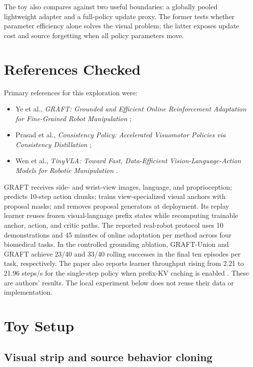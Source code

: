 \documentclass[11pt]{article}
\begin{document}
The toy also compares against two useful boundaries: a globally pooled lightweight adapter and a full-policy update proxy. The former tests whether parameter efficiency alone solves the visual problem; the latter exposes update cost and source forgetting when all policy parameters move.

\section{References Checked}

Primary references for this exploration were:
\begin{itemize}[leftmargin=1.5em]
  \item Ye et al., \emph{GRAFT: Grounded and Efficient Online Reinforcement Adaptation for Fine-Grained Robot Manipulation} \cite{graft};
  \item Prasad et al., \emph{Consistency Policy: Accelerated Visuomotor Policies via Consistency Distillation} \cite{consistency};
  \item Wen et al., \emph{TinyVLA: Toward Fast, Data-Efficient Vision-Language-Action Models for Robotic Manipulation} \cite{tinyvla}.
\end{itemize}

GRAFT receives side- and wrist-view images, language, and proprioception; predicts 10-step action chunks; trains view-specialized visual anchors with proposal masks; and removes proposal generators at deployment. Its replay learner reuses frozen visual-language prefix states while recomputing trainable anchor, action, and critic paths. The reported real-robot protocol uses 10 demonstrations and 45 minutes of online adaptation per method across four biomedical tasks. In the controlled grounding ablation, GRAFT-Union and GRAFT achieve 23/40 and 33/40 rolling successes in the final ten episodes per task, respectively. The paper also reports learner throughput rising from 2.21 to 21.96 steps/s for the single-step policy when prefix-KV caching is enabled \cite{graft}. These are authors' results. The local experiment below does not reuse their data or implementation.

\section{Toy Setup}

\subsection{Visual strip and source behavior cloning}
\end{document}
